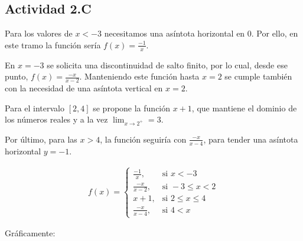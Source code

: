 \subsection*{Actividad 2.C}

Para los valores de $x < -3$ necesitamos una asíntota horizontal en 0.
Por ello, en este tramo la función sería $f(x) = \frac{-1}{x}$.

En $x = -3$ se solicita una discontinuidad de salto finito, por lo cual,
desde ese punto, $f(x) = \frac{-x}{x-2}$.
Manteniendo este función hasta $x = 2$ se cumple también con la necesidad de una asíntota vertical en $x = 2$.

Para el intervalo $[2, 4]$ se propone la función $x+1$, que mantiene el dominio de los números reales y a la vez $\lim_{x \to 2^+} = 3$.

Por último, para las $x > 4$,
la función seguiría con $\frac{-x}{x-4}$, para tender una asíntota horizontal $y = -1$.

\begin{align*}
    f(x) =
    \begin{cases}
        \frac{-1}{x},   & \text{si } x < -3          \\
        \frac{-x}{x-2}, & \text{si } -3 \leq x < 2   \\
        x+1,            & \text{si } 2 \leq x \leq 4 \\
        \frac{-x}{x-4}, & \text{si } 4 < x
    \end{cases}
\end{align*}

Gráficamente:

\begin{center}
\end{center}
